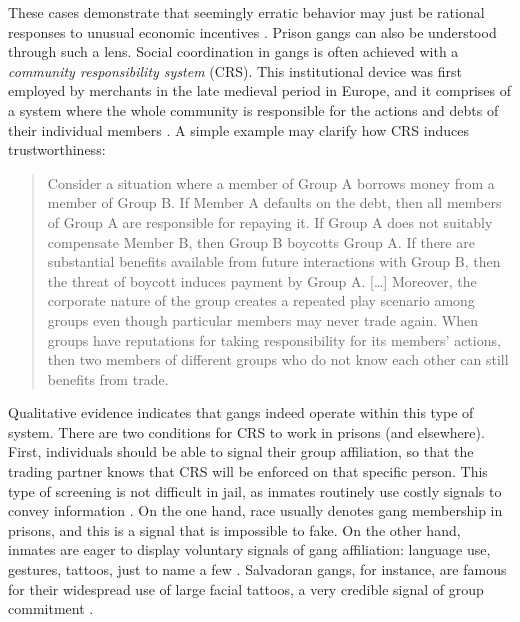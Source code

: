 \documentclass[a4paper, 12pt]{article}
\begin{document}
These cases demonstrate that seemingly erratic behavior may just be rational responses to unusual economic incentives \citep[p. 6]{leeson2009invisible}. Prison gangs can also be understood through such a lens. Social coordination in gangs is often achieved with a \textit{community responsibility system} (CRS). This institutional device was first employed by merchants in the late medieval period in Europe, and it comprises of a system where the whole community is responsible for the actions and debts of their individual members \citep{greif2006institutions}. A simple example may clarify how CRS induces trustworthiness: 

\begin{quote}
Consider a situation where a member of Group A borrows money from a member of Group B. If Member A defaults on the debt, then all members of Group A are responsible for repaying it. If Group A does not suitably compensate Member B, then Group B boycotts Group A. If there are substantial benefits available from future interactions with Group B, then the threat of boycott induces payment by Group A. [\dots] Moreover, the corporate nature of the group creates a repeated play scenario among groups even though particular members may never trade again. When groups have reputations for taking responsibility for its members' actions, then two members of different groups who do not know each other can still benefits from trade. \citep[p. 226]{roth2014prison}
\end{quote}

Qualitative evidence indicates that gangs indeed operate within this type of system. There are two conditions for CRS to work in prisons (and elsewhere). First, individuals should be able to signal their group affiliation, so that the trading partner knows that CRS will be enforced on that specific person. This type of screening is not difficult in jail, as inmates routinely use costly signals to convey information \citep{gambetta2009codes}. On the one hand, race usually denotes gang membership in prisons, and this is a signal that is impossible to fake. On the other hand, inmates are eager to display voluntary signals of gang affiliation: language use, gestures, tattoos, just to name a few \citep{kaminski2010games,valentine2000gangs}. Salvadoran gangs, for instance, are famous for their widespread use of large facial tattoos, a very credible signal of group commitment  \citep{cruz2010central,wolf2010maras}.
\end{document}
